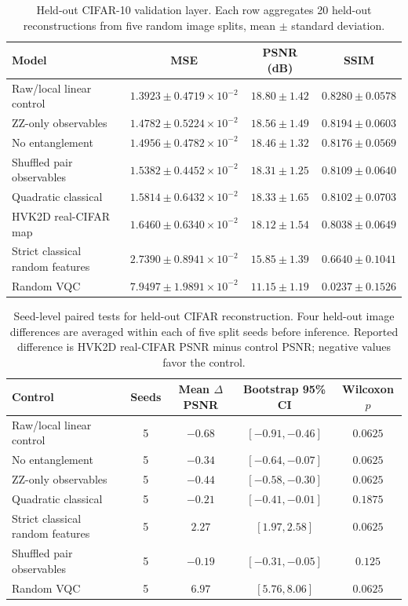 \documentclass[11pt]{article}
\begin{document}
\begin{table}[H]
\centering
\caption{Held-out CIFAR-10 validation layer. Each row aggregates 20 held-out reconstructions from five random image splits, mean $\pm$ standard deviation.}
\label{tab:hvk_real_cifar}
\scriptsize
\begin{tabular}{lccc}
\toprule
Model & MSE & PSNR (dB) & SSIM \\
\midrule
Raw/local linear control & $1.3923{\pm}0.4719\times10^{-2}$ & $18.80{\pm}1.42$ & $0.8280{\pm}0.0578$ \\
ZZ-only observables & $1.4782{\pm}0.5224\times10^{-2}$ & $18.56{\pm}1.49$ & $0.8194{\pm}0.0603$ \\
No entanglement & $1.4956{\pm}0.4782\times10^{-2}$ & $18.46{\pm}1.32$ & $0.8176{\pm}0.0569$ \\
Shuffled pair observables & $1.5382{\pm}0.4452\times10^{-2}$ & $18.31{\pm}1.25$ & $0.8109{\pm}0.0640$ \\
Quadratic classical & $1.5814{\pm}0.6432\times10^{-2}$ & $18.33{\pm}1.65$ & $0.8102{\pm}0.0703$ \\
HVK2D real-CIFAR map & $1.6460{\pm}0.6340\times10^{-2}$ & $18.12{\pm}1.54$ & $0.8038{\pm}0.0649$ \\
Strict classical random features & $2.7390{\pm}0.8941\times10^{-2}$ & $15.85{\pm}1.39$ & $0.6640{\pm}0.1041$ \\
Random VQC & $7.9497{\pm}1.9891\times10^{-2}$ & $11.15{\pm}1.19$ & $0.0237{\pm}0.1526$ \\
\bottomrule
\end{tabular}
\end{table}

\begin{table}[H]
\centering
\caption{Seed-level paired tests for held-out CIFAR reconstruction. Four held-out image differences are averaged within each of five split seeds before inference. Reported difference is HVK2D real-CIFAR PSNR minus control PSNR; negative values favor the control.}
\label{tab:hvk_real_cifar_stats}
\scriptsize
\begin{tabular}{lcccc}
\toprule
Control & Seeds & Mean $\Delta$PSNR & Bootstrap 95\% CI & Wilcoxon $p$ \\
\midrule
Raw/local linear control & 5 & $-0.68$ & $[-0.91,-0.46]$ & $0.0625$ \\
No entanglement & 5 & $-0.34$ & $[-0.64,-0.07]$ & $0.0625$ \\
ZZ-only observables & 5 & $-0.44$ & $[-0.58,-0.30]$ & $0.0625$ \\
Quadratic classical & 5 & $-0.21$ & $[-0.41,-0.01]$ & $0.1875$ \\
Strict classical random features & 5 & $2.27$ & $[1.97,2.58]$ & $0.0625$ \\
Shuffled pair observables & 5 & $-0.19$ & $[-0.31,-0.05]$ & $0.125$ \\
Random VQC & 5 & $6.97$ & $[5.76,8.06]$ & $0.0625$ \\
\bottomrule
\end{tabular}
\end{table}
\end{document}
